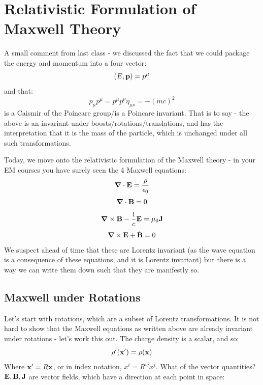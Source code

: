 \section{Relativistic Formulation of Maxwell Theory}

A small comment from last class - we discussed the fact that we could package the energy and momentum into a four vector:
\begin{equation}
    (E, \mathbf{p}) = p^\mu
\end{equation}
and that:
\begin{equation}
    p_\mu p^\mu = p^\mu p^\nu \eta_{\mu\nu} = -(mc)^2
\end{equation}
is a Caismir of the Poincare group/is a Poincare invariant. That is to say - the above is an invariant under boosts/rotations/translations, and has the interpretation that it is the mass of the particle, which is unchanged under all such transformations.

Today, we move onto the relativistic formulation of the Maxwell theory - in your EM courses you have surely seen the 4 Maxwell equations:
\begin{equation}
    \nabla \cdot \v{E} = \frac{\rho}{\e_0}
\end{equation}
\begin{equation}
    \nabla \cdot \v{B} = 0
\end{equation}
\begin{equation}
    \nabla \times \v{B} - \frac{1}{c}\v{E} = \mu_0 \v{J}
\end{equation}
\begin{equation}
    \nabla \times \v{E} + \dot{\v{B}} = 0
\end{equation}
We suspect ahead of time that these are Lorentz invariant (as the wave equation is a consequence of these equations, and it is Lorentz invariant) but there is a way we can write them down such that they are manifestly so.

\subsection{Maxwell under Rotations}
Let's start with rotations, which are a subset of Lorentz transformations. It is not hard to show that the Maxwell equations as written above are already invariant under rotations - let's work this out. The charge density is a scalar, and so:
\begin{equation}
    \rho'(\mathbf{x}') = \rho(\mathbf{x})
\end{equation}
Where $\mathbf{x}' = R\mathbf{x}$, or in index notation, $x^i = R^{ij}x^j$. What of the vector quantities? $\mathbf{E}, \mathbf{B}, \mathbf{J}$ are vector fields, which have a direction at each point in space:

